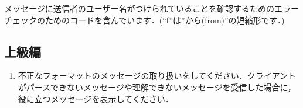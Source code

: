 メッセージに送信者のユーザー名がつけられていることを確認するためのエラーチェックのためのコードを含んでいます．(``f''は''から(from)''の短縮形です．)

\subsection{上級編}

\begin{enumerate}
\item 不正なフォーマットのメッセージの取り扱いをしてください．クライアントがパースできないメッセージや理解できないメッセージを受信した場合に，役に立つメッセージを表示してください．
\end{enumerate}
